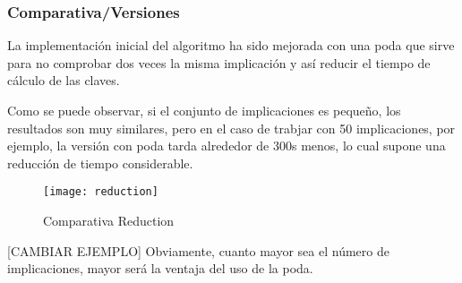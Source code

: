 \subsubsection{Comparativa/Versiones} 
La implementaci\'on inicial del algoritmo ha sido mejorada con una poda que sirve para no comprobar dos veces la misma implicaci\'on y as\'i reducir el tiempo de c\'alculo de las claves.

Como se puede observar, si el conjunto de implicaciones es peque\~no, los resultados son muy similares, pero en el caso de trabjar con 50 implicaciones, por ejemplo, la versi\'on con poda tarda alrededor de 300s menos, lo cual supone una reducci\'on de tiempo considerable.

\begin{figure}[H]
    \centering
    \texttt{[image: reduction]}
    \caption{Comparativa Reduction}
    \label{fig:reduction}
\end{figure}
[CAMBIAR EJEMPLO]
Obviamente, cuanto mayor sea el n\'umero de implicaciones, mayor ser\'a la ventaja del uso de la poda.
